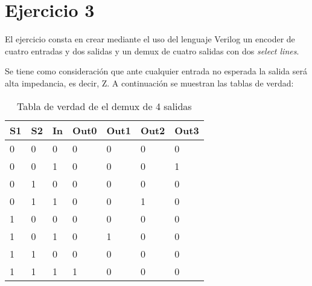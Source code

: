 \section{Ejercicio 3}
\noindent
El ejercicio consta en crear mediante el uso del lenguaje Verilog un encoder de cuatro entradas y dos salidas y un demux de cuatro salidas con dos \textit{select lines}.\par
Se tiene como consideración que ante cualquier entrada no esperada la salida será alta impedancia, es decir, Z.\newline
A continuaci\'on se muestran las tablas de verdad:

\begin{table}[H]
    \center
    \begin{tabular}{|lll|llll|}
    \hline
    \textbf{S1} & \textbf{S2} & \textbf{In} & \textbf{Out0} & \textbf{Out1} & \textbf{Out2} & \textbf{Out3} \\ \hline
    0           & 0           & 0           & 0             & 0             & 0             & 0             \\
    0           & 0           & 1           & 0             & 0             & 0             & 1             \\
    0           & 1           & 0           & 0             & 0             & 0             & 0             \\
    0           & 1           & 1           & 0             & 0             & 1             & 0             \\
    1           & 0           & 0           & 0             & 0             & 0             & 0             \\
    1           & 0           & 1           & 0             & 1             & 0             & 0             \\
    1           & 1           & 0           & 0             & 0             & 0             & 0             \\
    1           & 1           & 1           & 1             & 0             & 0             & 0             \\ \hline
    \end{tabular}
    \caption{Tabla de verdad de el demux de 4 salidas}
    \end{table}

